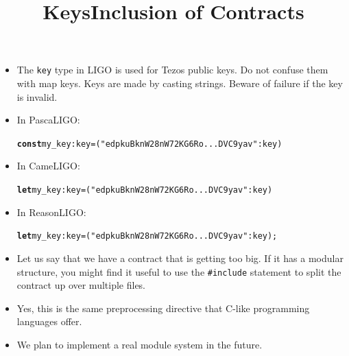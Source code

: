 \documentclass[wide]{slides}
\newcommand{\Kconst}[0]{\textbf{const}\xspace}
\newcommand{\Klet}[0]{\textbf{let}\xspace}
\begin{document}
\begin{slide}
  \title{Keys}

  \begin{itemize}

    \item The \texttt{key} type in LIGO is used for Tezos public
      keys. Do not confuse them with map keys. Keys are made by
      casting strings. Beware of failure if the key is invalid.

    \item In PascaLIGO:
      \begin{alltt}
\Kconst my_key : key = ("edpkuBknW28nW72KG6Ro...DVC9yav" : key)
      \end{alltt}

    \item In CameLIGO:
      \begin{alltt}
\Klet my_key : key = ("edpkuBknW28nW72KG6Ro...DVC9yav" : key)
      \end{alltt}

    \item In ReasonLIGO:
      \begin{alltt}
\Klet my_key : key = ("edpkuBknW28nW72KG6Ro...DVC9yav" : key);
      \end{alltt}

  \end{itemize}

\end{slide}

\begin{slide}
  \title{Inclusion of Contracts}

  \begin{itemize}

    \item Let us say that we have a contract that is getting too
      big. If it has a modular structure, you might find it useful to
      use the \texttt{\#include} statement to split the contract up
      over multiple files.

    \item Yes, this is the same preprocessing directive that C-like
      programming languages offer.

    \item We plan to implement a real module system in the future.

  \end{itemize}

\end{slide}
\end{document}
